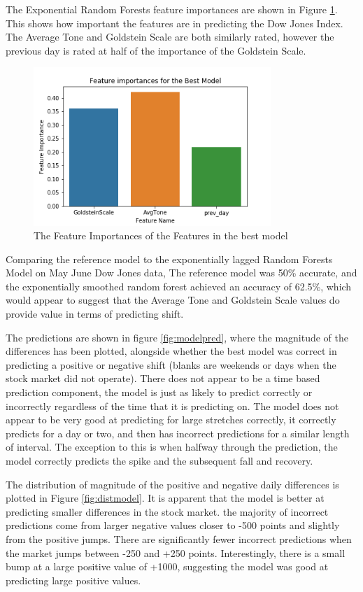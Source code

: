 The Exponential Random Forests feature importances are shown in Figure \ref{fig:featimport}. This shows how important the features are in predicting the Dow Jones Index. The Average Tone and Goldstein Scale are both similarly rated, however the previous day is rated at half of the importance of the Goldstein Scale.
\begin{figure}[H]
	\centering
	\includegraphics[width=0.8\textwidth]{images/feature_importance.png}
	\caption{The Feature Importances of the Features in the best model}
	\label{fig:featimport}
\end{figure}


Comparing the reference model to the exponentially lagged Random Forests Model on May June Dow Jones data, The reference model was 50\% accurate, and the exponentially smoothed random forest achieved an accuracy of 62.5\%, which would appear to suggest that the Average Tone and Goldstein Scale values do provide value in terms of predicting shift. 

The predictions are shown in figure \ref{fig:modelpred}, where the magnitude of the differences has been plotted, alongside whether the best model was correct in predicting a positive or negative shift (blanks are weekends or days when the stock market did not operate). There does not appear to be a time based prediction component, the model is just as likely to predict correctly or incorrectly regardless of the time that it is predicting on. The model does not appear to be very good at predicting for large stretches correctly, it correctly predicts for a day or two, and then has incorrect predictions for a similar length of interval. The exception to this is when halfway through the prediction, the model correctly predicts the spike and the subsequent fall and recovery. 

The distribution of magnitude of the positive and negative daily differences is plotted in Figure \ref{fig:distmodel}.  It is apparent that the model is better at predicting smaller differences in the stock market. the majority of incorrect predictions come from larger negative values closer to -500 points and slightly from the positive jumps. There are significantly fewer incorrect predictions when the market jumps between -250 and +250 points. Interestingly, there is a small bump at a large positive value of +1000, suggesting the model was good at predicting large positive values. 

